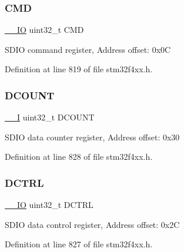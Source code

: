\subsubsection{\texorpdfstring{C\+MD}{CMD}}
{\footnotesize\ttfamily \hyperlink{group___c_m_s_i_s__core__definitions_gaec43007d9998a0a0e01faede4133d6be}{\+\_\+\+\_\+\+IO} uint32\+\_\+t C\+MD}

S\+D\+IO command register, Address offset\+: 0x0C 

Definition at line 819 of file stm32f4xx.\+h.

\mbox{\label{struct_s_d_i_o___type_def_a4273e2b5aeb7bdf1006909b1a2b59bc8}} 
\subsubsection{\texorpdfstring{D\+C\+O\+U\+NT}{DCOUNT}}
{\footnotesize\ttfamily \hyperlink{group___c_m_s_i_s__core__definitions_gaf63697ed9952cc71e1225efe205f6cd3}{\+\_\+\+\_\+I} uint32\+\_\+t D\+C\+O\+U\+NT}

S\+D\+IO data counter register, Address offset\+: 0x30 

Definition at line 828 of file stm32f4xx.\+h.

\mbox{\label{struct_s_d_i_o___type_def_a96a3d1a050982fccc23c2e6dbe0de068}} 
\subsubsection{\texorpdfstring{D\+C\+T\+RL}{DCTRL}}
{\footnotesize\ttfamily \hyperlink{group___c_m_s_i_s__core__definitions_gaec43007d9998a0a0e01faede4133d6be}{\+\_\+\+\_\+\+IO} uint32\+\_\+t D\+C\+T\+RL}

S\+D\+IO data control register, Address offset\+: 0x2C 

Definition at line 827 of file stm32f4xx.\+h.

\mbox{\label{struct_s_d_i_o___type_def_a612edc78d2fa6288392f8ea32c36f7fb}} 

